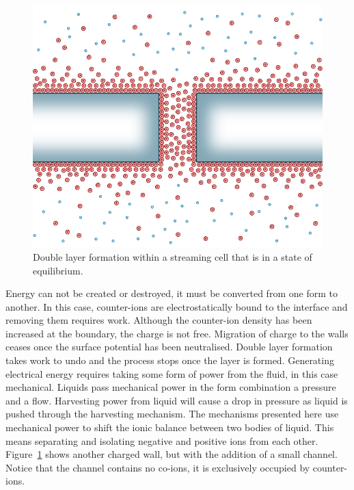   \begin{figure}
      \centering
      \includegraphics{content/pt1/01-PowerHarvesting/graphics/intro_2_channel_relaxed}
      \caption{
        \label{fig:doubleLayerInChannel_noPressure}
        Double layer formation within a streaming cell that is in a state of equilibrium.
      }
  \end{figure}
  Energy can not be created or destroyed, it must be converted from one form to another.
  In this case, counter-ions are electrostatically bound to the interface and removing them requires work.
  Although the counter-ion density has been increased at the boundary, the charge is not free.
  Migration of charge to the walls ceases once the surface potential has been neutralised.
  Double layer formation takes work to undo and the process stops once the layer is formed.
  Generating electrical energy requires taking some form of power from the fluid, in this case mechanical.
  Liquids pass mechanical power in the form combination a pressure and a flow.
  Harvesting power from liquid will cause a drop in pressure as liquid is pushed through the harvesting mechanism.
  The mechanisms presented here use mechanical power to shift the ionic balance between two bodies of liquid.
  This means separating and isolating negative and positive ions from each other.
  Figure~\ref{fig:doubleLayerInChannel_noPressure} shows another charged wall, but with the addition of a small channel.
  Notice that the channel contains no co-ions, it is exclusively occupied by counter-ions.
